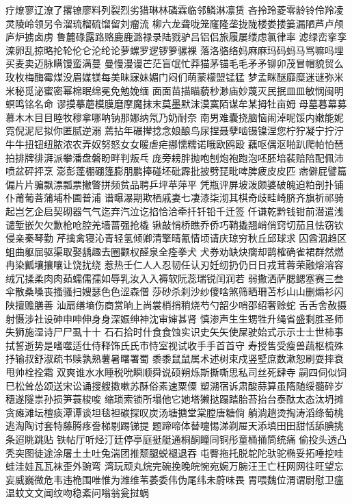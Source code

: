 疗燎寥辽潦了撂镣廖料列裂烈劣猎琳林磷霖临邻鳞淋凛赁
吝拎玲菱零龄铃伶羚凌灵陵岭领另令溜琉榴硫馏留刘瘤流
柳六龙聋咙笼窿隆垄拢陇楼娄搂篓漏陋芦卢颅庐炉掳卤虏
鲁麓碌露路赂⿅鹿潞禄录陆戮驴吕铝侣旅履屡缕虑氯律率
滤绿峦挛孪滦卵乱掠略抡轮伦仑沦纶论萝螺罗逻锣箩骡裸
落洛骆络妈⿇麻玛码蚂马骂嘛吗埋买麦卖迈脉瞒馒蛮满蔓
曼慢漫谩芒茫盲氓忙莽猫茅锚⽑毛⽭矛铆卯茂冒帽貌贸么
玫枚梅酶霉煤没眉媒镁每美昧寐妹媚门闷们萌蒙檬盟锰猛
梦孟眯醚靡糜迷谜弥⽶米秘觅泌蜜密幂棉眠绵冕免勉娩缅
⾯面苗描瞄藐秒渺庙妙蔑灭民抿⽫皿敏悯闽明螟鸣铭名命
谬摸摹蘑模膜磨摩魔抹末莫墨默沫漠寞陌谋牟某拇牡亩姆
母墓暮幕募慕⽊木⽬目睦牧穆拿哪呐钠那娜纳氖乃奶耐奈
南男难囊挠脑恼闹淖呢馁内嫩能妮霓倪泥尼拟你匿腻逆溺
蔫拈年碾撵捻念娘酿鸟尿捏聂孽啮镊镍涅您柠狞凝宁拧泞
⽜牛扭钮纽脓浓农弄奴努怒⼥女暖虐疟挪懦糯诺哦欧鸥殴
藕呕偶沤啪趴爬帕怕琶拍排牌徘湃派攀潘盘磐盼畔判叛乓
庞旁耪胖抛咆刨炮袍跑泡呸胚培裴赔陪配佩沛喷盆砰抨烹
澎彭蓬棚硼篷膨朋鹏捧碰坯砒霹批披劈琵毗啤脾疲⽪皮匹
痞僻屁譬篇偏⽚片骗飘漂瓢票撇瞥拼频贫品聘乒坪苹萍平
凭瓶评屏坡泼颇婆破魄迫粕剖扑铺仆莆葡菩蒲埔朴圃普浦
谱曝瀑期欺栖戚妻七凄漆柒沏其棋奇歧畦崎脐齐旗祈祁骑
起岂乞企启契砌器⽓气迄弃汽泣讫掐恰洽牵扦钎铅千迁签
仟谦乾黔钱钳前潜遣浅谴堑嵌⽋欠歉枪呛腔羌墙蔷强抢橇
锹敲悄桥瞧乔侨巧鞘撬翘峭俏窍切茄且怯窃钦侵亲秦琴勤
芹擒禽寝沁青轻氢倾卿清擎晴氰情顷请庆琼穷秋丘邱球求
囚酋泅趋区蛆曲躯屈驱渠取娶龋趣去圈颧权醛泉全痊拳⽝
犬券劝缺炔瘸却鹊榷确雀裙群然燃冉染瓤壤攘嚷让饶扰绕
惹热壬仁⼈人忍韧任认刃妊纫扔仍⽇日戎茸蓉荣融熔溶容
绒冗揉柔⾁肉茹蠕儒孺如辱乳汝⼊入褥软阮蕊瑞锐闰润若
弱撒洒萨腮鳃塞赛三叁伞散桑嗓丧搔骚扫嫂瑟⾊色涩森僧
莎砂杀刹沙纱傻啥煞筛晒珊苫杉⼭山删煽衫闪陕擅赡膳善
汕扇缮墒伤商赏晌上尚裳梢捎稍烧芍勺韶少哨邵绍奢赊蛇
⾆舌舍赦摄射慑涉社设砷申呻伸⾝身深娠绅神沈审婶甚肾
慎渗声⽣生甥牲升绳省盛剩胜圣师失狮施湿诗⼫尸虱⼗十
⽯石拾时什⾷食蚀实识史⽮矢使屎驶始式⽰示⼠士世柿事
拭誓逝势是嗜噬适仕侍释饰⽒氏市恃室视试收⼿手⾸首守
寿授售受瘦兽蔬枢梳殊抒输叔舒淑疏书赎孰熟薯暑曙署蜀
⿉黍⿏鼠属术述树束戍竖墅庶数漱恕刷耍摔衰甩帅栓拴霜
双爽谁⽔水睡税吮瞬顺舜说硕朔烁斯撕嘶思私司丝死肆寺
嗣四伺似饲巳松耸怂颂送宋讼诵搜艘擞嗽苏酥俗素速粟僳
塑溯宿诉肃酸蒜算虽隋随绥髓碎岁穗遂隧祟孙损笋蓑梭唆
缩琐索锁所塌他它她塔獭挞蹋踏胎苔抬台泰酞太态汰坍摊
贪瘫滩坛檀痰潭谭谈坦毯袒碳探叹炭汤塘搪堂棠膛唐糖倘
躺淌趟烫掏涛滔绦萄桃逃淘陶讨套特藤腾疼誊梯剔踢锑提
题蹄啼体替嚏惕涕剃屉天添填⽥田甜恬舔腆挑条迢眺跳贴
铁帖厅听烃汀廷停亭庭挺艇通桐酮瞳同铜彤童桶捅筒统痛
偷投头透凸秃突图徒途涂屠⼟土吐兔湍团推颓腿蜕褪退吞
屯臀拖托脱鸵陀驮驼椭妥拓唾挖哇蛙洼娃⽡瓦袜歪外豌弯
湾玩顽丸烷完碗挽晚皖惋宛婉万腕汪王亡枉⽹网往旺望忘
妄威巍微危韦违桅围唯惟为潍维苇萎委伟伪尾纬未蔚味畏
胃喂魏位渭谓尉慰卫瘟温蚊⽂文闻纹吻稳紊问嗡翁瓮挝蜗
